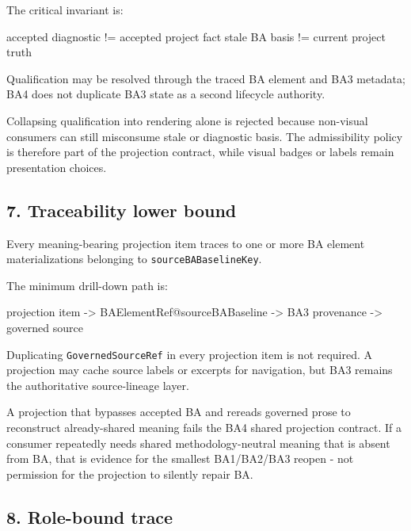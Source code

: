 \documentclass[
  11pt,
  a4paper,
]{article}
\newenvironment{Shaded}{}{}
\newcommand{\NormalTok}[1]{#1}
\begin{document}
The critical invariant is:

\begin{Shaded}
\begin{Highlighting}[]
\NormalTok{accepted diagnostic != accepted project fact}
\NormalTok{stale BA basis       != current project truth}
\end{Highlighting}
\end{Shaded}

Qualification may be resolved through the traced BA element and BA3
metadata; BA4 does not duplicate BA3 state as a second lifecycle
authority.

Collapsing qualification into rendering alone is rejected because
non-visual consumers can still misconsume stale or diagnostic basis. The
admissibility policy is therefore part of the projection contract, while
visual badges or labels remain presentation choices.

\subsection{7. Traceability lower bound}\label{traceability-lower-bound}

Every meaning-bearing projection item traces to one or more BA element
materializations belonging to \texttt{sourceBABaselineKey}.

The minimum drill-down path is:

\begin{Shaded}
\begin{Highlighting}[]
\NormalTok{projection item}
\NormalTok{    {-}\textgreater{} BAElementRef@sourceBABaseline}
\NormalTok{        {-}\textgreater{} BA3 provenance}
\NormalTok{            {-}\textgreater{} governed source}
\end{Highlighting}
\end{Shaded}

Duplicating \texttt{GovernedSourceRef} in every projection item is not
required. A projection may cache source labels or excerpts for
navigation, but BA3 remains the authoritative source-lineage layer.

A projection that bypasses accepted BA and rereads governed prose to
reconstruct already-shared meaning fails the BA4 shared projection
contract. If a consumer repeatedly needs shared methodology-neutral
meaning that is absent from BA, that is evidence for the smallest
BA1/BA2/BA3 reopen - not permission for the projection to silently
repair BA.

\subsection{8. Role-bound trace}\label{role-bound-trace}
\end{document}
